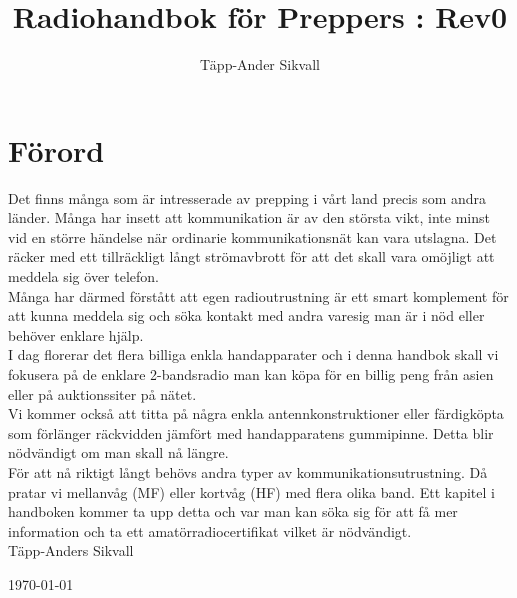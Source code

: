 \documentclass[12ypt,swedish,a4paper]{report}
\begin{document}
\title{Radiohandbok för Preppers : Rev0}
\author{Täpp-Ander Sikvall}
\maketitle

\section*{Förord}

Det finns många som är intresserade av prepping i vårt land precis som andra länder. Många har insett att kommunikation är av den största vikt, inte minst vid en större händelse när ordinarie kommunikationsnät kan vara utslagna. Det räcker med ett tillräckligt långt strömavbrott för att det skall vara omöjligt att meddela sig över telefon.\\

Många har därmed förstått att egen radioutrustning är ett smart komplement för att kunna meddela sig och söka kontakt med andra varesig man är i nöd eller behöver enklare hjälp.\\

I dag florerar det flera billiga enkla handapparater och i denna handbok skall vi fokusera på de enklare 2-bandsradio man kan köpa för en billig peng från asien eller på auktionssiter på nätet.\\

Vi kommer också att titta på några enkla antennkonstruktioner eller färdigköpta som förlänger räckvidden jämfört med handapparatens gummipinne. Detta blir nödvändigt om man skall nå längre.\\

För att nå riktigt långt behövs andra typer av kommunikationsutrustning. Då pratar vi mellanvåg (MF) eller kortvåg (HF) med flera olika band. Ett kapitel i handboken kommer ta upp detta och var man kan söka sig för att få mer information och ta ett amatörradiocertifikat vilket är nödvändigt.\\

Täpp-Anders Sikvall

\today

\clearpage

\tableofcontents

\setlength{\parskip}{1em}
\setlength{\parindent}{0pt}

\pagestyle{fancy}

\lhead{\nouppercase{\leftmark}}
\chead{}
\rhead{\nouppercase{\rightmark}}
\end{document}
